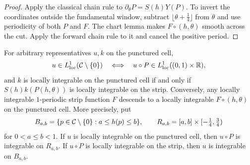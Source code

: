 \begin{proof}
\leanok
Apply the classical chain rule to $\partial_\theta P=S(h)Y(P)$.
To invert the coordinates outside the fundamental window, subtract
$\lfloor\theta+\frac14\rfloor$ from $\theta$ and use periodicity of both
$P$ and $F$. The chart lemma makes $F\circ(h,\theta)$ smooth across the
cut. Apply the forward chain rule to it and cancel the positive period.
\end{proof}

\begin{lemma}
\label{lem:action-angle-local-integrability}
\leanok
For arbitrary representatives $u,k$ on the punctured cell,
\[
  u\in L^1_{\mathrm{loc}}(\mathcal{C}\setminus\{0\})
    \quad\Longleftrightarrow\quad
  u\circ P\in L^1_{\mathrm{loc}}((0,1)\times\mathbb{R}),
\]
and $k$ is locally integrable on the punctured cell if and only if
$S(h)k(P(h,\theta))$ is locally integrable on the strip.
Conversely, any locally integrable $1$-periodic strip function $F$
descends to a locally integrable $F\circ(h,\theta)$ on the punctured cell.
More precisely, put
\[
  B_{a,b}=\{p\in\mathcal{C}\setminus\{0\}:a\le h(p)\le b\},\qquad
  R_{a,b}=[a,b]\times[-\tfrac14,\tfrac34)
\]
for $0<a\le b<1$. If $u$ is locally integrable on the punctured cell,
then $u\circ P$ is integrable on $R_{a,b}$. If $u\circ P$ is locally
integrable on the strip, then $u$ is integrable on $B_{a,b}$.
\end{lemma}

